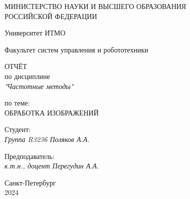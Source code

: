 \thispagestyle{empty}

\begin{center}
    МИНИСТЕРСТВО НАУКИ И ВЫСШЕГО ОБРАЗОВАНИЯ \\ РОССИЙСКОЙ ФЕДЕРАЦИИ

    \vspace{20pt}

    Университет ИТМО

    \vspace{20pt}

    Факультет систем управления и робототехники
\end{center}

\vfill

\begin{center}
    ОТЧЁТ \\  
    по дисциплине \\
    \textit{"Частотные методы"}

    \vspace{20pt}

    по теме: \\
    \uppercase{Обработка изображений}
\end{center}

\vfill

    \noindent Студент: \\
    \textit{Группа R3236 \hfill Поляков А.А.}

    \vspace{20pt}

    \noindent Предподаватель: \\
    \textit{к.т.н., доцент \hfill Перегудин А.А.}

\vfill

\begin{center}
    Санкт-Петербург \\ 2024
\end{center}